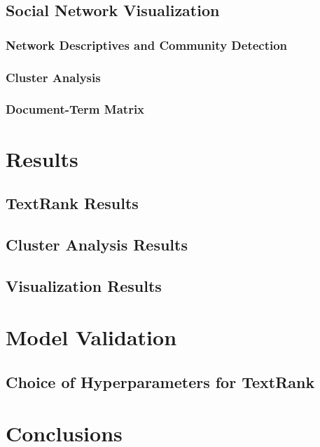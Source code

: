 \documentclass[11pt]{article}
\begin{document}
\subsection{Social Network Visualization}\label{sna_nw}


\subsubsection{Network Descriptives and Community Detection}


\subsubsection{Cluster Analysis}


\subsubsection{Document-Term Matrix}


\section{Results}
\subsection{TextRank Results}

\subsection{Cluster Analysis Results}

\subsection{Visualization Results}


\section{Model Validation}
\subsection{Choice of Hyperparameters for TextRank}


\section{Conclusions}

\end{document}
